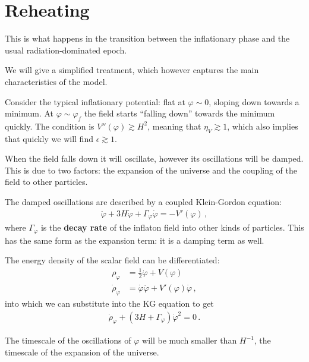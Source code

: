 \documentclass[main.tex]{subfiles}
\begin{document}
\section{Reheating}


This is what happens in the transition between the inflationary phase and the usual radiation-dominated epoch. 

We will give a simplified treatment, which however captures the main characteristics of the model.

Consider the typical inflationary potential: flat at \(\varphi \sim 0\), sloping down towards a minimum. At \(\varphi \sim \varphi _f\) the field starts ``falling down'' towards the minimum quickly.
The condition is \(V''(\varphi ) \gtrsim H^2\), meaning that \(\eta _V \gtrsim 1\), which also implies that quickly we will find \(\epsilon \gtrsim 1\). 

When the field falls down it will oscillate, however its oscillations will be damped.
This is due to two factors: the expansion of the universe and the coupling of the field to other particles. 

The damped oscillations are described by a coupled Klein-Gordon equation: 
%
\begin{align}
\ddot{\varphi} + 3 H \dot{\varphi} + \Gamma _\varphi \dot{\varphi} = - V' (\varphi )
\,,
\end{align}
%
where \(\Gamma _\varphi \) is the \textbf{decay rate} of the inflaton field into other kinds of particles. 
This has the same form as the expansion term: it is a damping term as well.

The energy density of the scalar field can be differentiated:
%
\begin{align}
\rho _\varphi &= \frac{1}{2} \dot{\varphi} + V(\varphi )  \label{eq:scalar-field-energy-density}\\
\dot{\rho}_\varphi &= \dot{\varphi} \ddot{\varphi} + V' (\varphi ) \dot{\varphi}
\,,
\end{align}
%
into which we can substitute into the KG equation to get
%
\begin{align}
\dot{\rho}_\varphi + (3 H + \Gamma _\varphi ) \dot{\varphi}^2 = 0
\,.
\end{align}

The timescale of the oscillations of \(\varphi \) will be much smaller than \(H^{-1}\), the timescale of the expansion of the universe. 
\end{document}
